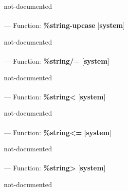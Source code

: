 \begin{adjustwidth}{5em}{5em}
not-documented
\end{adjustwidth}

\paragraph{}
\label{SYSTEM:STRING-UPCASE}
--- Function: \textbf{\%string-upcase} [\textbf{system}] \textit{}

\begin{adjustwidth}{5em}{5em}
not-documented
\end{adjustwidth}

\paragraph{}
\label{SYSTEM:STRING/=}
--- Function: \textbf{\%string/=} [\textbf{system}] \textit{}

\begin{adjustwidth}{5em}{5em}
not-documented
\end{adjustwidth}

\paragraph{}
\label{SYSTEM:STRING<}
--- Function: \textbf{\%string<} [\textbf{system}] \textit{}

\begin{adjustwidth}{5em}{5em}
not-documented
\end{adjustwidth}

\paragraph{}
\label{SYSTEM:STRING<=}
--- Function: \textbf{\%string<=} [\textbf{system}] \textit{}

\begin{adjustwidth}{5em}{5em}
not-documented
\end{adjustwidth}

\paragraph{}
\label{SYSTEM:STRING>}
--- Function: \textbf{\%string>} [\textbf{system}] \textit{}

\begin{adjustwidth}{5em}{5em}
not-documented
\end{adjustwidth}

